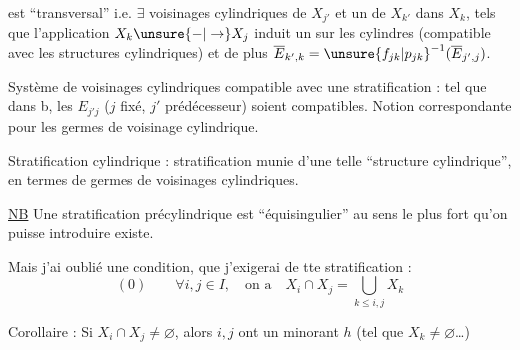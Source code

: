 est ``transversal'' i.e.  $\exists$ voisinages cylindriques
de $X_{j'}$  et un de $X_{k'}$ dans $X_k$, tels que l'application
$X_k\unsure{-|\to}X_j$ induit un  sur les
cylindres (compatible avec les structures
cylindriques) et de plus
$\overline E_{k',k}=\unsure{f_{jk}|p_{jk}}^{-1}(\overline E_{j',j})$.

Système de voisinages cylindriques 
compatible avec une stratification : tel que
dans b, les $E_{j'j}$ ($j$ fixé, $j'$ prédécesseur)
soient compatibles. Notion correspondante
pour les germes de voisinage cylindrique.

Stratification cylindrique : stratification munie
d'une telle ``structure cylindrique'', en
termes de germes de voisinages cylindriques.

\uline{NB} Une stratification précylindrique 
est 
``équisingulier'' au sens le plus fort qu'on
puisse introduire  existe.

Mais j'ai oublié une condition, que j'exigerai
de tte stratification :
\[
(0)\qquad \forall i,j\in I,\quad\text{on a}\quad
X_i\cap X_j=\bigcup_{k\le i,j}X_k
\]

Corollaire : Si $X_i\cap X_j\ne\varnothing$, alors $i,j$ ont un
minorant $h$ (tel que  $X_k\ne\varnothing$\ldots)

